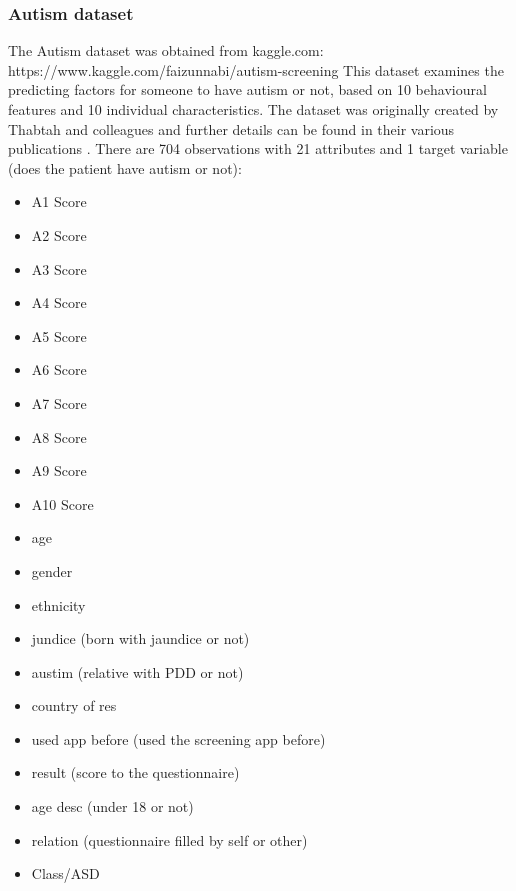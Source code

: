 \subsubsection{Autism dataset}
The Autism dataset was obtained from kaggle.com:\newline
https://www.kaggle.com/faizunnabi/autism-screening\newline
This dataset examines the predicting factors for someone to have autism or not, based on 10 behavioural features and 10 individual characteristics. The dataset was originally created by Thabtah and colleagues and further details can be found in their various publications \citep{Thabtah:2018ck}.\newline
There are 704 observations with 21 attributes and 1 target variable (does the patient have autism or not):\newline
\begin{itemize}
    \item A1 Score 
    \item A2 Score
    \item A3 Score 
    \item A4 Score
    \item A5 Score
    \item A6 Score
    \item A7 Score
    \item A8 Score
    \item A9 Score
    \item A10 Score
    \item age
    \item gender
    \item ethnicity 
    \item jundice (born with jaundice or not)
    \item austim (relative with PDD or not)
    \item country of res
    \item used app before (used the screening app before)
    \item result (score to the questionnaire)
    \item age desc (under 18 or not)
    \item relation (questionnaire filled by self or other)
    \item Class/ASD
\end{itemize}

